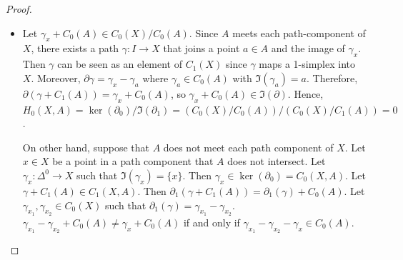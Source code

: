 \documentclass[12pt, psamsfonts]{amsart}
\theoremstyle{definition}
\theoremstyle{remark}
\numberwithin{equation}{section}
\begin{document}
\begin{proof}
  $ $
  \begin{itemize}
    \item
      Let $\gamma_x + C_0(A) \in C_0(X) / C_0(A)$.
      Since $A$ meets each path-component of $X$, there exists a path $\gamma: I \rightarrow X$ that joins a point $a \in A$ and the image of $\gamma_x$.
      Then $\gamma$ can be seen as an element of $C_1(X)$ since $\gamma$ maps a 1-simplex into $X$.
      Moreover, $\partial\gamma = \gamma_x - \gamma_a$ where $\gamma_a \in C_0(A)$ with $\Im(\gamma_a) = a$.
      Therefore, $\partial(\gamma + C_1(A)) = \gamma_x + C_0(A)$, so $\gamma_x + C_0(A) \in \Im(\partial)$.
      Hence, $H_0(X, A) = \ker(\partial_0)/\Im(\partial_1) = (C_0(X)/C_0(A)) / (C_0(X)/C_1(A)) = 0$.

      On other hand, suppose that $A$ does not meet each path component of $X$.
      Let $x \in X$ be a point in a path component that $A$ does not intersect.
      Let $\gamma_x: \Delta^0 \rightarrow X$ such that $\Im(\gamma_x) = \{ x \}$.
      Then $\gamma_x \in \ker(\partial_0) = C_0(X, A)$.
      Let $\gamma + C_1(A) \in C_1(X, A)$.
      Then $\partial_1(\gamma + C_1(A)) = \partial_1(\gamma) + C_0(A)$.
      Let $\gamma_{x_1}, \gamma_{x_2} \in C_0(X)$ such that $\partial_1(\gamma) = \gamma_{x_1} - \gamma_{x_2}$.
      $\gamma_{x_1} - \gamma_{x_2} + C_0(A) \ne \gamma_x + C_0(A)$ if and only if $\gamma_{x_1} - \gamma_{x_2} - \gamma_x \in C_0(A)$.


\end{itemize}
\end{proof}
\end{document}
